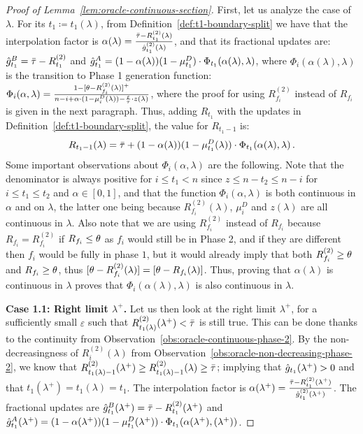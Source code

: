 \begin{proof}[Proof of Lemma~\ref{lem:oracle-continuous-section}]
    First, let us analyze the case of $\lambda$. For its $t_1\coloneqq t_1(\lambda)$, from Definition~\ref{def:t1-boundary-split} we have that the interpolation factor is $\alpha(\lambda) = \frac{\bar\tau-R_{t_1}^{(2)}(\lambda)}{\hat{g}_{t_1}^{(2)}(\lambda)}$, and that its fractional updates are: $\hat{g}_{t_1}^B = \bar\tau - R_{t_1}^{(2)}$ and $\hat{g}_{t_1}^A = (1 - \alpha(\lambda))(1 - \mu_{t_1}^D) \cdot \Phi_{t_1}(\alpha(\lambda),\lambda)$, where $\Phi_i(\alpha(\lambda),\lambda)$ is the transition to Phase 1 generation function: 
    $\Phi_i(\alpha,\lambda) = \frac{1-[\theta-R_{f_i}^{(2)}(\lambda)]^+}{n-i+\alpha\cdot(1-\mu_i^D(\lambda))-\frac{\varepsilon}{\tau}\cdot z(\lambda)}$, where the proof for using $R_{f_i}^{(2)}$ instead of $R_{f_i}$ is given in the next paragraph. 
    Thus, adding $R_{t_1}$ with the updates in Definition~\ref{def:t1-boundary-split}, the value for $R_{t_1-1}$ is:
    \begin{equation*}
        R_{t_1-1}(\lambda) = \bar\tau + (1 - \alpha(\lambda))(1 - \mu_{t_1}^D(\lambda)) \cdot \Phi_{t_1}(\alpha(\lambda),\lambda)\,.
    \end{equation*}
    Some important observations about $\Phi_i(\alpha,\lambda)$ are the following. Note that the denominator is always positive for $i\leq t_1<n$ since $z\leq n-t_2 \leq n-i$ for $i\leq t_1\leq t_2$ and $\alpha \in [0,1]$, and that the function $\Phi_i(\alpha,\lambda)$ is both continuous in $\alpha$ and on $\lambda$, the latter one being because $R_{f_i}^{(2)}(\lambda)$, $\mu_i^D$ and $z(\lambda)$ are all continuous in $\lambda$. 
    Also note that we are using $R_{f_i}^{(2)}$ instead of $R_{f_i}$ because $R_{f_i}=R_{f_i}^{(2)}$ if $R_{f_i}\leq \theta$ as $f_i$ would still be in Phase 2, and if they are different then $f_i$ would be fully in phase $1$, but it would already imply that both $R_{f_i}^{(2)}\geq \theta$ and $R_{f_i}\geq \theta$, thus $[\theta-R_{f_i}^{(2)}(\lambda)]=[\theta-R_{f_i}(\lambda)]$.
    Thus, proving that $\alpha(\lambda)$ is continuous in $\lambda$ proves that $\Phi_i(\alpha(\lambda),\lambda)$ is also continuous in $\lambda$.
    
    \smallskip
    \noindent\textbf{Case 1.1: Right limit $\lambda^+$.}
    Let us then look at the right limit $\lambda^+$, for a sufficiently small $\varepsilon$ such that $R_{t_1(\lambda)}^{(2)}(\lambda^+)<\bar\tau$ is still true. This can be done thanks to the continuity from Observation~\ref{obs:oracle-continuous-phase-2}. By the non-decreasingness of $R_i^{(2)}(\lambda)$ from Observation~\ref{obs:oracle-non-decreasing-phase-2}, we know that $R_{t_1(\lambda)-1}^{(2)}(\lambda^+) \geq R_{t_1(\lambda)-1}^{(2)}(\lambda)\geq \bar\tau$; implying that $\hat{g}_{t_1}(\lambda^+)>0$ and that $t_1(\lambda^+)=t_1(\lambda)= t_1$.
    The interpolation factor is $\alpha(\lambda^+) = \frac{\bar\tau-R_{t_1}^{(2)}(\lambda^+)}{\hat{g}_{t_1}^{(2)}(\lambda^+)}$.
    The fractional updates are $\hat{g}_{t_1}^B(\lambda^+) = \bar\tau - R_{t_1}^{(2)}(\lambda^+)$ and $\hat{g}_{t_1}^A(\lambda^+) = (1 - \alpha(\lambda^+))(1 - \mu_{t_1}^D(\lambda^+) ) \cdot \Phi_{t_1}(\alpha(\lambda^+), (\lambda^+))$.
    

\end{proof}
